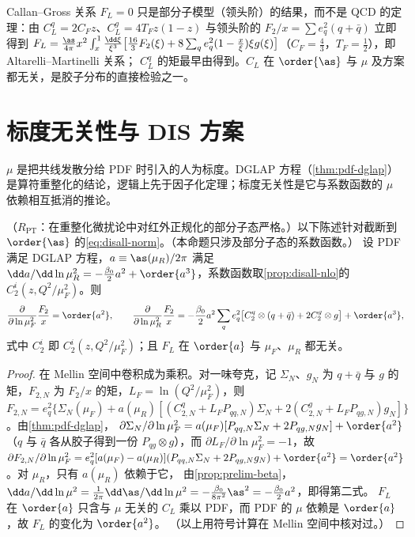 \noindent
Callan--Gross 关系 $F_L=0$ 只是部分子模型（领头阶）的结果，而不是 QCD 的定理：由 $C_L^q=2C_Fz$、$C_L^g=4T_Fz(1-z)$ 与领头阶的 $F_2/x=\sum e_q^2(q+\bar q)$ 立即得到
$F_L=\frac{\as}{4\pi}x^2\int_x^1\frac{\dd\xi}{\xi^3}\big[\frac{16}3F_2(\xi)+8\sum_qe_q^2(1-\frac x\xi)\xi g(\xi)\big]$（$C_F=\frac43$，$T_F=\frac12$），即 Altarelli--Martinelli 关系\cite{AltarelliMartinelli1978}；
$C_L^q$ 的矩最早由\cite{Zee:1974du}得到。$C_L$ 在 $\order{\as}$ 与 $\mu$ 及方案都无关，是胶子分布的直接检验之一。

\section{标度无关性与 DIS 方案}\label{sec:disall-scale}

$\mu$ 是把共线发散分给 PDF 时引入的人为标度。DGLAP 方程（\cref{thm:pdf-dglap}）是算符重整化的结论，逻辑上先于因子化定理；标度无关性是它与系数函数的 $\mu$ 依赖相互抵消的推论。

\begin{proposition}\label{prop:disall-scale}
（$R_{\mathrm{PT}}$：在重整化微扰论中对红外正规化的部分子态严格。）以下陈述针对截断到 $\order{\as}$ 的\cref{eq:disall-norm}。（本命题只涉及部分子态的系数函数。）
设 PDF 满足 DGLAP 方程，$a\equiv\as(\mu_R)/2\pi$ 满足 $\dd a/\dd\ln\mu_R^2=-\frac{\beta_0}2a^2+\order{a^3}$，系数函数取\cref{prop:disall-nlo}的 $C_2^i(z,Q^2/\mu_F^2)$。则
\begin{equation}\label{eq:disall-scale}
\frac{\partial}{\partial\ln\mu_F^2}\frac{F_2}x=\order{a^2},\qquad
\frac{\partial}{\partial\ln\mu_R^2}\frac{F_2}x=-\frac{\beta_0}2a^2\sum_qe_q^2\big[C_2^q\otimes(q+\bar q)+2C_2^g\otimes g\big]+\order{a^3},   %
\end{equation}
式中 $C_2^i$ 即 $C_2^i(z,Q^2/\mu_F^2)$；且 $F_L$ 在 $\order{a}$ 与 $\mu_F$、$\mu_R$ 都无关。
\end{proposition}

\begin{proof}
在 Mellin 空间中卷积成为乘积。对一味夸克，记 $\Sigma_N$、$g_N$ 为 $q+\bar q$ 与 $g$ 的矩，$F_{2,N}$ 为 $F_2/x$ 的矩，$L_F=\ln(Q^2/\mu_F^2)$，则
$F_{2,N}=e_q^2\{\Sigma_N(\mu_F)+a(\mu_R)[(C^q_{2,N}+L_FP_{qq,N})\Sigma_N+2(C^g_{2,N}+L_FP_{qg,N})g_N]\}$。由\cref{thm:pdf-dglap}，
$\partial\Sigma_N/\partial\ln\mu_F^2=a(\mu_F)[P_{qq,N}\Sigma_N+2P_{qg,N}g_N]+\order{a^2}$（$q$ 与 $\bar q$ 各从胶子得到一份 $P_{qg}\otimes g$），而 $\partial L_F/\partial\ln\mu_F^2=-1$，故
$\partial F_{2,N}/\partial\ln\mu_F^2=e_q^2[a(\mu_F)-a(\mu_R)](P_{qq,N}\Sigma_N+2P_{qg,N}g_N)+\order{a^2}=\order{a^2}$。对 $\mu_R$，只有 $a(\mu_R)$ 依赖于它，
由\cref{prop:prelim-beta}，$\dd a/\dd\ln\mu^2=\frac1{2\pi}\dd\as/\dd\ln\mu^2=-\frac{\beta_0}{8\pi^2}\as^2=-\frac{\beta_0}2a^2$，即得第二式。
$F_L$ 在 $\order{a}$ 只含与 $\mu$ 无关的 $C_L$ 乘以 PDF，而 PDF 的 $\mu$ 依赖是 $\order{a}$，故 $F_L$ 的变化为 $\order{a^2}$。
（以上用符号计算在 Mellin 空间中核对过。）
\end{proof}

